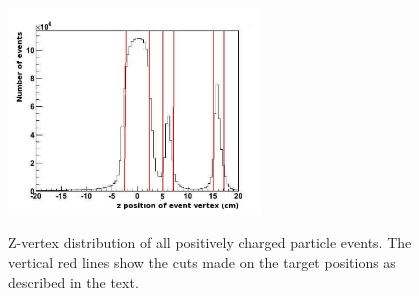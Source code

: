 \begin{figure}[!htb]
  \begin{center}
    \includegraphics[width=0.6\textwidth]{figures/targets_pos.png} \\
    \caption{Z-vertex distribution of all positively charged particle events. The vertical red lines show the cuts made on the target positions as described in the text.}
    \label{fig:target_pos}
  \end{center}
\end{figure}




